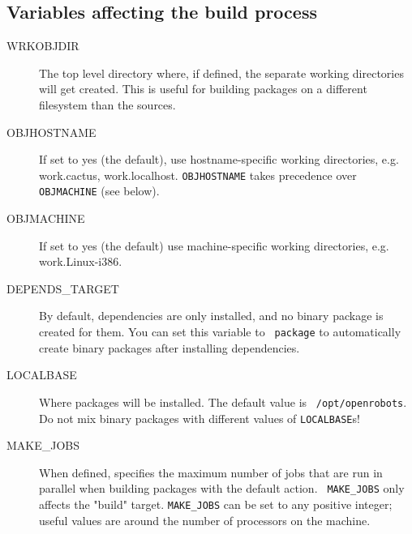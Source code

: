 \subsection{Variables affecting the build process} %

\begin{description}
   \item[WRKOBJDIR] The top level   directory where, if defined,  the  separate
   working directories will get created.  This is useful for building  packages
   on a different filesystem than the \robotpkg sources.

   \item[OBJHOSTNAME] If set to yes (the default), use hostname-specific
   working directories, e.g. work.cactus, work.localhost. {\tt OBJHOSTNAME}
   takes precedence over {\tt OBJMACHINE} (see below).

   \item[OBJMACHINE] If set to yes (the default) use machine-specific working
   directories, e.g. work.Linux-i386.

   \item[DEPENDS\_TARGET] By default,  dependencies are only installed,  and no
   binary package is  created  for them. You  can  set  this variable  to  {\tt
   package}   to   automatically  create    binary  packages   after installing
   dependencies.

   \item[LOCALBASE] Where packages will be installed. The default value is {\tt
   /opt/openrobots}.  Do not  mix     binary  packages with    different values
   of {\tt LOCALBASE}s!

   \item[MAKE\_JOBS] When defined, specifies the maximum number of jobs that
   are run in parallel when building packages with the default action. {\tt
   MAKE\_JOBS} only affects the "build" target. {\tt MAKE\_JOBS} can be set to
   any positive integer; useful values are around the number of processors on
   the machine.


\end{description}


